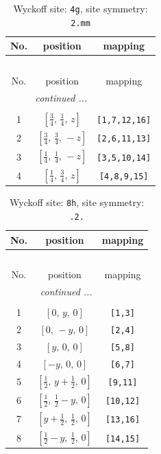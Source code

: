 \documentclass[fleqn,8pt]{jsarticle}
\begin{document}
\renewcommand{\arraystretch}{1.2}
\begin{longtable}{ccc}
\caption{Wyckoff site: {\tt 4g}, site symmetry: {\tt 2.mm}}
 \\
 \hline \hline
No. & position & mapping \\ \hline \endfirsthead

\multicolumn{2}{l}{\tablename\ \thetable{}} \\
 \hline \hline
No. & position & mapping \\ \hline \endhead

 \hline \hline
\multicolumn{2}{r}{\footnotesize\it continued ...} \\ \endfoot

 \hline \hline
\multicolumn{2}{r}{} \\ \endlastfoot

1 & $\left[ \frac{3}{4},\, \frac{1}{4},\, z \right]$ & {\tt [1,7,12,16]} \\ \hline
2 & $\left[ \frac{3}{4},\, \frac{3}{4},\, - z \right]$ & {\tt [2,6,11,13]} \\ \hline
3 & $\left[ \frac{1}{4},\, \frac{1}{4},\, - z \right]$ & {\tt [3,5,10,14]} \\ \hline
4 & $\left[ \frac{1}{4},\, \frac{3}{4},\, z \right]$ & {\tt [4,8,9,15]} \\
\end{longtable}
\renewcommand{\arraystretch}{1.2}
\begin{longtable}{ccc}
\caption{Wyckoff site: {\tt 8h}, site symmetry: {\tt .2.}}
 \\
 \hline \hline
No. & position & mapping \\ \hline \endfirsthead

\multicolumn{2}{l}{\tablename\ \thetable{}} \\
 \hline \hline
No. & position & mapping \\ \hline \endhead

 \hline \hline
\multicolumn{2}{r}{\footnotesize\it continued ...} \\ \endfoot

 \hline \hline
\multicolumn{2}{r}{} \\ \endlastfoot

1 & $\left[ 0,\, y,\, 0 \right]$ & {\tt [1,3]} \\ \hline
2 & $\left[ 0,\, - y,\, 0 \right]$ & {\tt [2,4]} \\ \hline
3 & $\left[ y,\, 0,\, 0 \right]$ & {\tt [5,8]} \\ \hline
4 & $\left[ - y,\, 0,\, 0 \right]$ & {\tt [6,7]} \\ \hline
5 & $\left[ \frac{1}{2},\, y + \frac{1}{2},\, 0 \right]$ & {\tt [9,11]} \\ \hline
6 & $\left[ \frac{1}{2},\, \frac{1}{2} - y,\, 0 \right]$ & {\tt [10,12]} \\ \hline
7 & $\left[ y + \frac{1}{2},\, \frac{1}{2},\, 0 \right]$ & {\tt [13,16]} \\ \hline
8 & $\left[ \frac{1}{2} - y,\, \frac{1}{2},\, 0 \right]$ & {\tt [14,15]} \\
\end{longtable}
\end{document}
